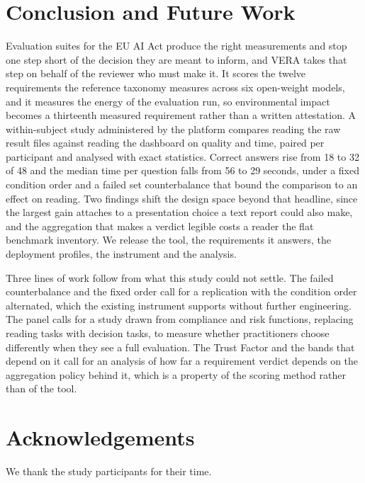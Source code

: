 \documentclass[10pt,conference]{IEEEtran}
\begin{document}
\section{Conclusion and Future Work}
\label{sec:conclusion}

Evaluation suites for the EU AI Act produce the right measurements and stop one step short of the decision they are meant to inform, and VERA takes that step on behalf of the reviewer who must make it.
It scores the twelve requirements the reference taxonomy measures across six open-weight models, and it measures the energy of the evaluation run, so environmental impact becomes a thirteenth measured requirement rather than a written attestation.
A within-subject study administered by the platform compares reading the raw result files against reading the dashboard on quality and time, paired per participant and analysed with exact statistics.
Correct answers rise from 18 to 32 of 48 and the median time per question falls from 56 to 29 seconds, under a fixed condition order and a failed set counterbalance that bound the comparison to an effect on reading.
Two findings shift the design space beyond that headline, since the largest gain attaches to a presentation choice a text report could also make, and the aggregation that makes a verdict legible costs a reader the flat benchmark inventory.
We release the tool, the requirements it answers, the deployment profiles, the instrument and the analysis.

Three lines of work follow from what this study could not settle.
The failed counterbalance and the fixed order call for a replication with the condition order alternated, which the existing instrument supports without further engineering.
The panel calls for a study drawn from compliance and risk functions, replacing reading tasks with decision tasks, to measure whether practitioners choose differently when they see a full evaluation.
The Trust Factor and the bands that depend on it call for an analysis of how far a requirement verdict depends on the aggregation policy behind it, which is a property of the scoring method rather than of the tool.
\section*{Acknowledgements}
We thank the study participants for their time.

{\footnotesize


}

\end{document}
